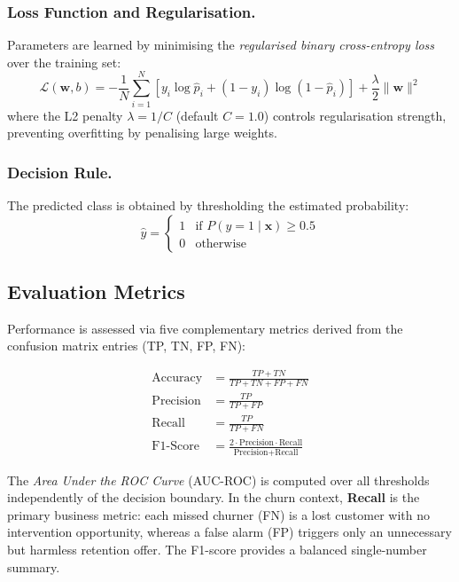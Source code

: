 \documentclass{llncs}
\begin{document}
\subsubsection{Loss Function and Regularisation.}
Parameters are learned by minimising the \emph{regularised binary
cross-entropy loss} over the training set:
\begin{equation}
  \mathcal{L}(\mathbf{w},b)
  = -\frac{1}{N}\sum_{i=1}^{N}\!\left[y_i\log\hat{p}_i
    + (1-y_i)\log(1-\hat{p}_i)\right]
    + \frac{\lambda}{2}\|\mathbf{w}\|^2
  \label{eq:loss}
\end{equation}
where the L2 penalty $\lambda = 1/C$ (default $C = 1.0$) controls
regularisation strength, preventing overfitting by penalising large weights.

\subsubsection{Decision Rule.}
The predicted class is obtained by thresholding the estimated probability:
\begin{equation}
  \hat{y} =
  \begin{cases}
    1 & \text{if } P(y{=}1 \mid \mathbf{x}) \geq 0.5 \\
    0 & \text{otherwise}
  \end{cases}
  \label{eq:decision}
\end{equation}

\subsection{Evaluation Metrics}

Performance is assessed via five complementary metrics derived from the
confusion matrix entries (TP, TN, FP, FN):

\begin{align}
  \text{Accuracy}  &= \frac{TP+TN}{TP+TN+FP+FN} \label{eq:acc}\\[4pt]
  \text{Precision} &= \frac{TP}{TP+FP}           \label{eq:prec}\\[4pt]
  \text{Recall}    &= \frac{TP}{TP+FN}            \label{eq:rec}\\[4pt]
  \text{F1-Score}  &= \frac{2\cdot\text{Precision}\cdot\text{Recall}}
                          {\text{Precision}+\text{Recall}} \label{eq:f1}
\end{align}

The \emph{Area Under the ROC Curve} (AUC-ROC) is computed over all
thresholds independently of the decision boundary.
In the churn context, \textbf{Recall} is the primary business metric:
each missed churner (FN) is a lost customer with no intervention
opportunity, whereas a false alarm (FP) triggers only an unnecessary but
harmless retention offer. The F1-score provides a balanced single-number summary.
\end{document}
